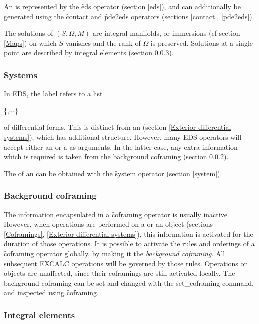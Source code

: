 An  is represented by the \f{eds} operator (section \ref{eds}),
and can additionally be generated using the \f{contact} and \f{pde2eds}
operators (sections \ref{contact}, \ref{pde2eds}).

The solutions of $(S,\Omega,M)$ are integral manifolds, or immersions (cf
section \ref{Maps}) on which $S$ vanishes and the rank of $\Omega$ is
preserved. Solutions at a single point are described by integral elements
(section \ref{Integral elements}).

\subsubsection{Systems}
\label{Systems}

In EDS, the label  refers to a list
\begin{edssyntax}
	\{,$\cdots$\}
\end{edssyntax}
of differential forms. This is distinct from an  (section
\ref{Exterior differential systems}), which has additional structure.
However, many EDS operators will accept either an  or a
 as arguments. In the latter case, any extra information
which is required is taken from the background coframing (section
\ref{Background coframing}). 

The  of an  can be obtained with the \f{system}
operator (section \ref{system}).

\subsubsection{Background coframing}
\label{Background coframing}

The information encapsulated in a \f{coframing} operator is usually
inactive. However, when operations are performed on a  or an
 object (sections \ref{Coframings}, \ref{Exterior differential
systems}), this information is activated for the duration of those
operations. It is possible to activate the rules and orderings of a
\f{coframing} operator globally, by making it the {\em background
coframing}. All subsequent EXCALC operations will be governed by those
rules. Operations on  objects are unaffected, since their
coframings are still activated locally. The background coframing can be set
and changed with the \f{set\_coframing} command, and inspected using
\f{coframing}.

\subsubsection{Integral elements}
\label{Integral elements}

